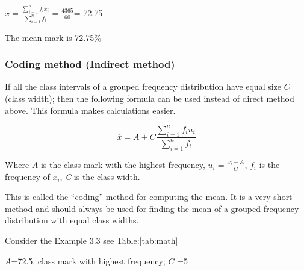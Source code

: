 \documentclass[
]{book}
\begin{document}
\(\overline{x} = \frac{\sum_{i = 1}^{n}{f_{i}x_{i}}}{\sum_{i = 1}^{n}f_{i}} = \frac{4365}{60}\)=
72.75

The mean mark is 72.75\%

\subsubsection{Coding method (Indirect method)}\label{coding-method-indirect-method}

If all the class intervals of a grouped frequency distribution have
equal size \(C\) (class width); then the following formula can be used
instead of direct method above. This formula makes calculations easier.

\[\overline{x} = A + C\frac{\sum_{i = 1}^{n}{f_{i}u_{i}}}{\sum_{i = 1}^{n}f_{i}}\]

Where \(A\) is the class mark with the highest frequency,
\(u_{i} = \frac{x_{i} - A}{C}\), \(f_{i}\) is the frequency of \(x_{i}\), \emph{C}
is the class width.

This is called the ``coding'' method for computing the mean. It is a very
short method and should always be used for finding the mean of a grouped
frequency distribution with equal class widths.

Consider the Example 3.3 see Table:\ref{tab:math}

\(A\)=72.5, class mark with highest frequency; \(C\) =5
\end{document}
